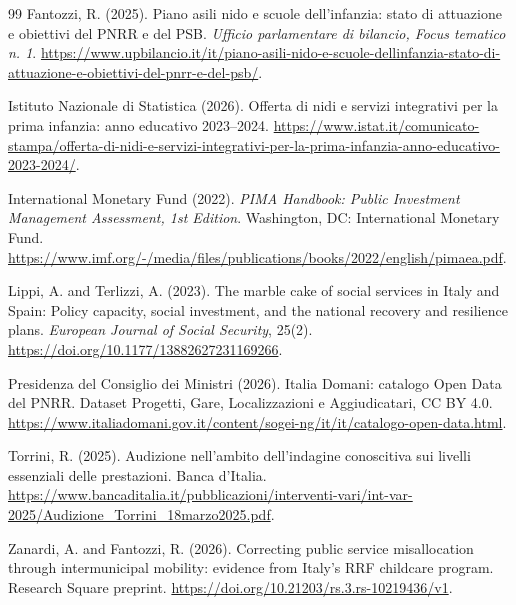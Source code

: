 \documentclass[10pt,a4paper]{article}
\begin{document}
\begin{thebibliography}{99}
Fantozzi, R. (2025).
\newblock Piano asili nido e scuole dell'infanzia: stato di attuazione e obiettivi del PNRR e del PSB.
\newblock \emph{Ufficio parlamentare di bilancio, Focus tematico n. 1}.
\newblock \url{https://www.upbilancio.it/it/piano-asili-nido-e-scuole-dellinfanzia-stato-di-attuazione-e-obiettivi-del-pnrr-e-del-psb/}.

Istituto Nazionale di Statistica (2026).
\newblock Offerta di nidi e servizi integrativi per la prima infanzia: anno educativo 2023--2024.
\newblock \url{https://www.istat.it/comunicato-stampa/offerta-di-nidi-e-servizi-integrativi-per-la-prima-infanzia-anno-educativo-2023-2024/}.

International Monetary Fund (2022).
\newblock \emph{PIMA Handbook: Public Investment Management Assessment, 1st Edition}.
\newblock Washington, DC: International Monetary Fund.
\newblock \url{https://www.imf.org/-/media/files/publications/books/2022/english/pimaea.pdf}.

Lippi, A. and Terlizzi, A. (2023).
\newblock The marble cake of social services in Italy and Spain: Policy capacity, social investment, and the national recovery and resilience plans.
\newblock \emph{European Journal of Social Security}, 25(2).
\newblock \url{https://doi.org/10.1177/13882627231169266}.

Presidenza del Consiglio dei Ministri (2026).
\newblock Italia Domani: catalogo Open Data del PNRR.
\newblock Dataset Progetti, Gare, Localizzazioni e Aggiudicatari, CC BY 4.0.
\newblock \url{https://www.italiadomani.gov.it/content/sogei-ng/it/it/catalogo-open-data.html}.

Torrini, R. (2025).
\newblock Audizione nell'ambito dell'indagine conoscitiva sui livelli essenziali delle prestazioni.
\newblock Banca d'Italia.
\newblock \url{https://www.bancaditalia.it/pubblicazioni/interventi-vari/int-var-2025/Audizione_Torrini_18marzo2025.pdf}.

Zanardi, A. and Fantozzi, R. (2026).
\newblock Correcting public service misallocation through intermunicipal mobility: evidence from Italy's RRF childcare program.
\newblock Research Square preprint.
\newblock \url{https://doi.org/10.21203/rs.3.rs-10219436/v1}.

\end{thebibliography}
\end{document}
